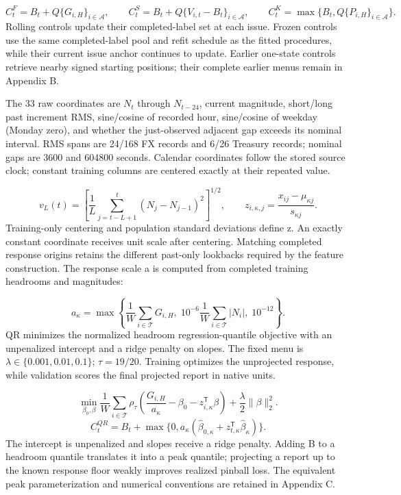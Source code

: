\documentclass[10pt,a4paper]{article}
\begin{document}
\[
C^F_t=B_t+Q\{G_{i,H}\}_{i\in\mathcal A},\qquad C^S_t=B_t+Q\{V_{i,t}-B_t\}_{i\in\mathcal A},\qquad C^K_t=\max\{B_t,Q\{P_{i,H}\}_{i\in\mathcal A}\}.
\]
Rolling controls update their completed-label set at each issue. Frozen controls use the same completed-label pool and refit schedule as the fitted procedures, while their current issue anchor continues to update. Earlier one-state controls retrieve nearby signed starting positions; their complete earlier menus remain in Appendix B.

The 33 raw coordinates are \(N_t\) through \(N_{t-24}\), current magnitude, short/long past increment RMS, sine/cosine of recorded hour, sine/cosine of weekday (Monday zero), and whether the just-observed adjacent gap exceeds its nominal interval. RMS spans are 24/168 FX records and 6/26 Treasury records; nominal gaps are 3600 and 604800 seconds. Calendar coordinates follow the stored source clock; constant training columns are centered exactly at their repeated value.

\[
v_L(t)=\left[\frac1L\sum_{j=t-L+1}^{t}(N_j-N_{j-1})^2\right]^{1/2},\qquad z_{i,\kappa,j}=\frac{x_{ij}-\mu_{\kappa j}}{s_{\kappa j}}.
\]
Training-only centering and population standard deviations define z. An exactly constant coordinate receives unit scale after centering. Matching completed response origins retains the different past-only lookbacks required by the feature construction. The response scale a is computed from completed training headrooms and magnitudes:

\[
a_\kappa=\max\left\{\frac1W\sum_{i\in\mathcal T}G_{i,H},\;10^{-6}\frac1W\sum_{i\in\mathcal T}|N_i|,\;10^{-12}\right\}.
\]
QR minimizes the normalized headroom regression-quantile objective with an unpenalized intercept and a ridge penalty on slopes. The fixed menu is \(\lambda\in\{0.001,0.01,0.1\}\); \(\tau=19/20\). Training optimizes the unprojected response, while validation scores the final projected report in native units.

\[
\min_{\beta_0,\beta}\frac1W\sum_{i\in\mathcal T}\rho_\tau\!\left(\frac{G_{i,H}}{a_\kappa}-\beta_0-z_{i,\kappa}^{\mathsf T}\beta\right)+\frac\lambda2\|\beta\|_2^2.
\]
\[
C_t^{QR}=B_t+\max\{0,a_\kappa(\widehat\beta_{0,\kappa}+z_{t,\kappa}^{\mathsf T}\widehat\beta_\kappa)\}.
\]
The intercept is unpenalized and slopes receive a ridge penalty. Adding B to a headroom quantile translates it into a peak quantile; projecting a report up to the known response floor weakly improves realized pinball loss. The equivalent peak parameterization and numerical conventions are retained in Appendix C.
\end{document}
